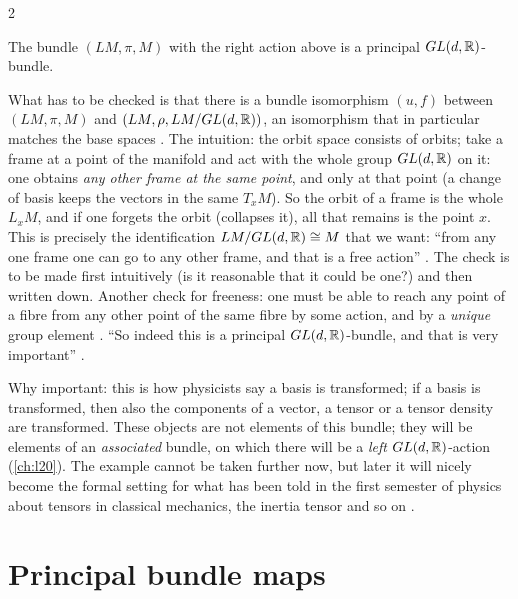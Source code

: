 \begin{paracol}{2}
\begin{proposition}\label{prop:pb-frame-principal}
The bundle $(LM,\pi,M)$ with the right action above is a principal $GL(d,\mathbb{R})$-bundle.   
\end{proposition}
What has to be checked is that there is a bundle isomorphism $(u,f)$ between $(LM,\pi,M)$ and $(LM,\rho,LM/GL(d,\mathbb{R}))$, an isomorphism that in particular matches the base spaces   . The intuition: the orbit space consists of orbits; take a frame at a point of the manifold and act with the whole group $GL(d,\mathbb{R})$ on it: one obtains \emph{any other frame at the same point}, and only at that point (a change of basis keeps the vectors in the same $T_xM$). So the orbit of a frame is the whole $L_xM$, and if one forgets the orbit (collapses it), all that remains is the point $x$. This is precisely the identification $LM/GL(d,\mathbb{R})\cong M$ that we want: ``from any one frame one can go to any other frame, and that is a free action''     . The check is to be made first intuitively (is it reasonable that it could be one?) and then written down. Another check for freeness: one must be able to reach any point of a fibre from any other point of the same fibre by some action, and by a \emph{unique} group element   . ``So indeed this is a principal $GL(d,\mathbb{R})$-bundle, and that is very important''  .

Why important: this is how physicists say a basis is transformed; if a basis is transformed, then also the components of a vector, a tensor or a tensor density are transformed. These objects are not elements of this bundle; they will be elements of an \emph{associated} bundle, on which there will be a \emph{left} $GL(d,\mathbb{R})$-action (\cref{ch:l20}). The example cannot be taken further now, but later it will nicely become the formal setting for what has been told in the first semester of physics about tensors in classical mechanics, the inertia tensor and so on   .

\section{Principal bundle maps}\label{sec:pb-pbmap}


\end{paracol}
